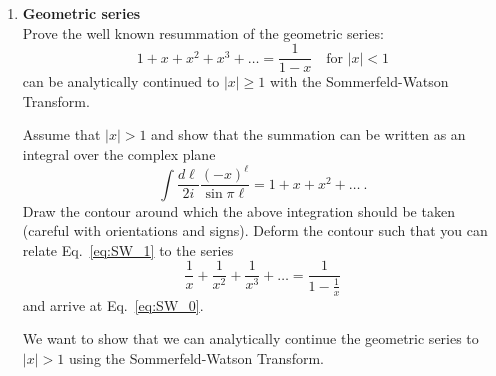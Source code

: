 
\begin{enumerate}
    \item \textbf{Geometric series} \\
          Prove the well known resummation of the geometric series:
          \begin{equation}\label{eq:SW_0}
              1 + x + x^2 + x^3 + \dots =  \frac{1}{1-x} \quad \text{for } |x| < 1
          \end{equation}
          can be analytically continued to $|x| \geq 1$ with the Sommerfeld-Watson Transform.

          Assume that $|x| > 1$ and show that the summation can be written as an integral over the complex plane
          \begin{equation}
              \label{eq:SW_1}
              \int \frac{d\ell}{2i} \frac{(-x)^\ell}{\sin \pi \ell} = 1 + x + x^2 + \dots ~.
          \end{equation}
          Draw the contour around which the above integration should be taken (careful with orientations and signs).
          Deform the contour such that you can relate Eq.~\ref{eq:SW_1} to the series
          \begin{equation}
              \frac{1}{x} + \frac{1}{x^2} + \frac{1}{x^3} + \dots = \frac{1}{1- \frac{1}{x}}
          \end{equation}
          and arrive at Eq.~\ref{eq:SW_0}.

          \begin{solution}
              We want to show that we can analytically continue the geometric series to $|x|>1$ using the Sommerfeld-Watson Transform.


\end{solution}
\end{enumerate}

